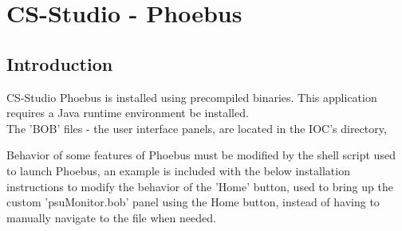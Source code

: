 \chapter{CS-Studio - Phoebus}
\label{chap:cs-studio}

\section{Introduction}
CS-Studio Phoebus is installed using precompiled binaries. This application requires a Java runtime environment be installed.\\

\noindent The 'BOB' files - the user interface panels, are located in the IOC's directory, 

\noindent Behavior of some features of Phoebus must be modified by the shell script used to launch Phoebus, an example is included with the below installation instructions to modify the behavior of the 'Home' button, used to bring up the custom 'psuMonitor.bob' panel using the Home button, instead of having to manually navigate to the file when needed.\\

